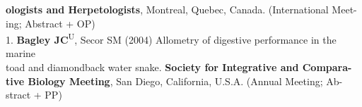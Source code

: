 \documentclass[margin,line]{res}
\begin{document}
\begin{resume}
\hspace*{8mm} \textbf{ologists and Herpetologists}, Montreal, Quebec, Canada. (International Meet-\\ \vspace{2mm}
\hspace*{8mm}ing; Abstract + OP) \\
1. \textbf{Bagley JC}\textsuperscript{U}, Secor SM (2004) Allometry of digestive performance in the marine\\
\hspace*{8mm} toad and diamondback water snake. \textbf{Society for Integrative and Compara-}\\
\hspace*{8mm} \textbf{tive Biology Meeting}, San Diego, California, U.S.A. (Annual Meeting; Ab- \\ \vspace{2mm}
\hspace*{8mm}stract + PP)





\end{resume}
\end{document}
